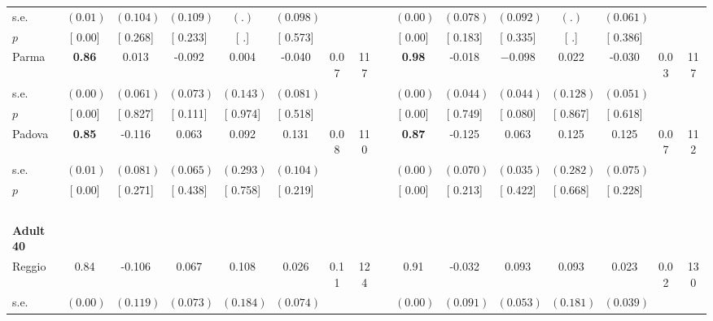 \begin{longtable}{L{8em} c c c c c c c p{1em} c c c c c c c}
\quad \quad \quad \quad s.e.& $ (     0.01)$ & $ (    0.104)$ & $ (    0.109)$ & $ (        .)$ & $ (    0.098)$ & & & & $ (     0.00)$ & $ (    0.078)$ & $ (    0.092)$ & $ (        .)$ & $ (    0.061)$ & &  \\*
\quad \quad \quad \quad $ p$ & [     0.00] & [    0.268] & [    0.233] & [        .] & [    0.573] & & & & [     0.00] & [    0.183] & [    0.335] & [        .] & [    0.386] & &  \\[1em]
\quad \quad \quad Parma& \textbf{     0.86} &     0.013 &    -0.092 &     0.004 &    -0.040 &      0.07 &       117 & & \textbf{     0.98} &    -0.018 & $ \mathbf{   -0.098}$ &     0.022 &    -0.030 &      0.03 &       117  \\*
\quad \quad \quad \quad s.e.& $ (     0.00)$ & $ (    0.061)$ & $ (    0.073)$ & $ (    0.143)$ & $ (    0.081)$ & & & & $ (     0.00)$ & $ (    0.044)$ & $ (    0.044)$ & $ (    0.128)$ & $ (    0.051)$ & &  \\*
\quad \quad \quad \quad $ p$ & [     0.00] & [    0.827] & [    0.111] & [    0.974] & [    0.518] & & & & [     0.00] & [    0.749] & [    0.080] & [    0.867] & [    0.618] & &  \\[1em]
\quad \quad \quad Padova& \textbf{     0.85} &    -0.116 &     0.063 &     0.092 &     0.131 &      0.08 &       110 & & \textbf{     0.87} &    -0.125 &     0.063 &     0.125 &     0.125 &      0.07 &       112  \\*
\quad \quad \quad \quad s.e.& $ (     0.01)$ & $ (    0.081)$ & $ (    0.065)$ & $ (    0.293)$ & $ (    0.104)$ & & & & $ (     0.00)$ & $ (    0.070)$ & $ (    0.035)$ & $ (    0.282)$ & $ (    0.075)$ & &  \\*
\quad \quad \quad \quad $ p$ & [     0.00] & [    0.271] & [    0.438] & [    0.758] & [    0.219] & & & & [     0.00] & [    0.213] & [    0.422] & [    0.668] & [    0.228] & &  \\[1em]
~\\[1em]
\quad \quad \textbf{Adult 40} & & & & & & & & & & & & & & & \\* 
\quad \quad \quad Reggio& 0.84 &    -0.106 &     0.067 &     0.108 &     0.026 &      0.11 &       124 & & 0.91 &    -0.032 &     0.093 &     0.093 &     0.023 &      0.02 &       130  \\*
\quad \quad \quad \quad s.e.& $ (     0.00)$ & $ (    0.119)$ & $ (    0.073)$ & $ (    0.184)$ & $ (    0.074)$ & & & & $ (     0.00)$ & $ (    0.091)$ & $ (    0.053)$ & $ (    0.181)$ & $ (    0.039)$ & &  \\*

\end{longtable}
